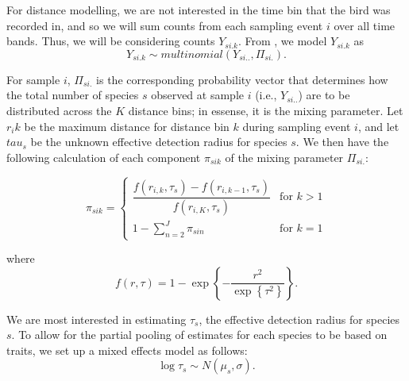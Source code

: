 \documentclass[12pt]{article}
\begin{document}
\par For distance modelling, we are not interested in the time bin that the bird was recorded in, and so we will sum counts from each sampling event $i$ over all time bands. 
Thus, we will be considering counts $Y_{si.k}$. 
From \citet{solymos_calibrating_2013}, we model $Y_{si.k}$ as
$$Y_{si.k} \sim multinomial\left(Y_{si..}, \Pi_{si.}\right).$$

\par For sample $i$, $\Pi_{si.}$ is the corresponding probability vector that determines how the total number of species $s$ observed at sample $i$ (i.e., $Y_{si..}$) are to be distributed across the $K$ distance bins; in essense, it is the mixing parameter. 
Let $r_ik$ be the maximum distance for distance bin $k$ during sampling event $i$, and let $tau_s$ be the unknown effective detection radius for species $s$. 
We then have the following calculation of each component $\pi_{sik}$ of the mixing parameter $\Pi_{si.}$:


\begin{equation*}
	\pi_{sik} = 
	\begin{cases}
		\dfrac{f(r_{i,k}, \tau_s) - f(r_{i,k-1}, \tau_s)}{f(r_{i,K}, \tau_s)} & \text{for } k > 1 \\
		1 - \sum_{n = 2}^{J} \pi_{sin} & \text{for } k = 1
	\end{cases}
\end{equation*}

where 
$$f(r,\tau) =  1 - \exp\left\{ -\dfrac{r^2}{\exp\left\{\tau^2\right\}} \right\} .$$

\par We are most interested in estimating $\tau_s$, the effective detection radius for species $s$. 
To allow for the partial pooling of estimates for each species to be based on traits, we set up a mixed effects model as follows:
$$\log \tau_s \sim N(\mu_s, \sigma).$$
\end{document}
